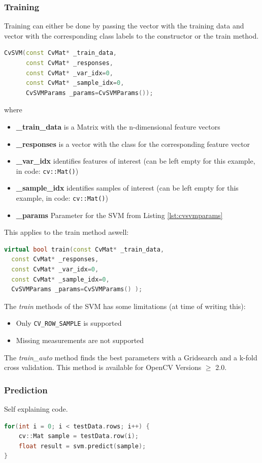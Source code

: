 \subsubsection*{Training}
Training can either be done by passing the vector with the training data and vector with the corresponding class labels to the constructor or the train method.
\begin{lstlisting}[language=C++]
CvSVM(const CvMat* _train_data, 
      const CvMat* _responses,
      const CvMat* _var_idx=0,
      const CvMat* _sample_idx=0,
      CvSVMParams _params=CvSVMParams());
\end{lstlisting}
where
\begin{itemize}
 \item \textbf{\_train\_data} is a Matrix with the n-dimensional feature vectors
 \item \textbf{\_responses} is a vector with the class for the corresponding feature vector
 \item \textbf{\_var\_idx} identifies features of interest (can be left empty for this example, in code: \texttt{cv::Mat()})
 \item \textbf{\_sample\_idx} identifies samples of interest (can be left empty for this example, in code: \texttt{cv::Mat()})
 \item \textbf{\_params} Parameter for the SVM from Listing \ref{lst:cvsvmparams}
\end{itemize}
This applies to the train method aswell:
\begin{lstlisting}[language=C++]
virtual bool train(const CvMat* _train_data, 
  const CvMat* _responses,
  const CvMat* _var_idx=0,
  const CvMat* _sample_idx=0,
  CvSVMParams _params=CvSVMParams() );
\end{lstlisting}

The \textit{train} methods of the SVM has some limitations (at time of writing this):

 \begin{itemize}
  \item Only \verb|CV_ROW_SAMPLE| is supported
  \item Missing measurements are not supported
 \end{itemize}
The \textit{train\_auto} method finds the best parameters with a Gridsearch and a k-fold cross validation. This method is available for OpenCV Versions $\geq$ 2.0.

\subsubsection*{Prediction}
Self explaining code.
\begin{lstlisting}[language=C++]
for(int i = 0; i < testData.rows; i++) {
	cv::Mat sample = testData.row(i);
	float result = svm.predict(sample);
}
\end{lstlisting}

